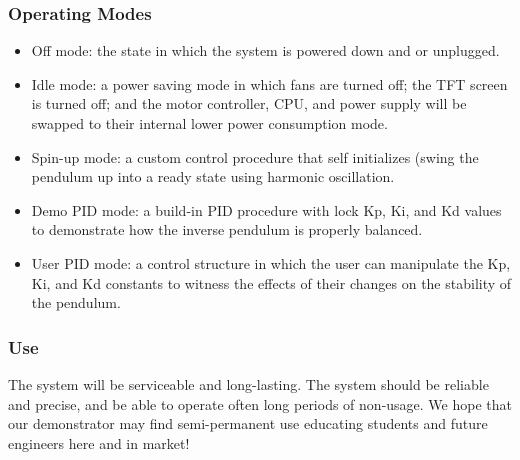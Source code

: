 \documentclass[aspectratio=169]{beamer}
\begin{document}
\begin{frame}
    \frametitle{Operating Modes}

    \begin{itemize}
        \item Off mode: the state in which the system is powered down and or unplugged.
        \item Idle mode: a power saving mode in which fans are turned off; the TFT screen is turned off; and the motor controller, CPU, and power supply will be swapped to their internal lower power consumption mode.
        \item Spin-up mode: a custom control procedure that self initializes (swing the pendulum up into a ready state using harmonic oscillation.
        \item Demo PID mode: a build-in PID procedure with lock Kp, Ki, and Kd values to demonstrate how the inverse pendulum is properly balanced.
        \item User PID mode: a control structure in which the user can manipulate the Kp, Ki, and Kd constants to witness the effects of their changes on the stability of the pendulum.
    \end{itemize}

\end{frame}


\begin{frame}
    \frametitle{Use}
    The system will be serviceable and long-lasting. The system should be reliable and precise, and be able to operate often long periods of non-usage.
    \vspace{.5cm}
    We hope that our demonstrator may find semi-permanent use educating students and future
    engineers here and in market!

\end{frame}
\end{document}
